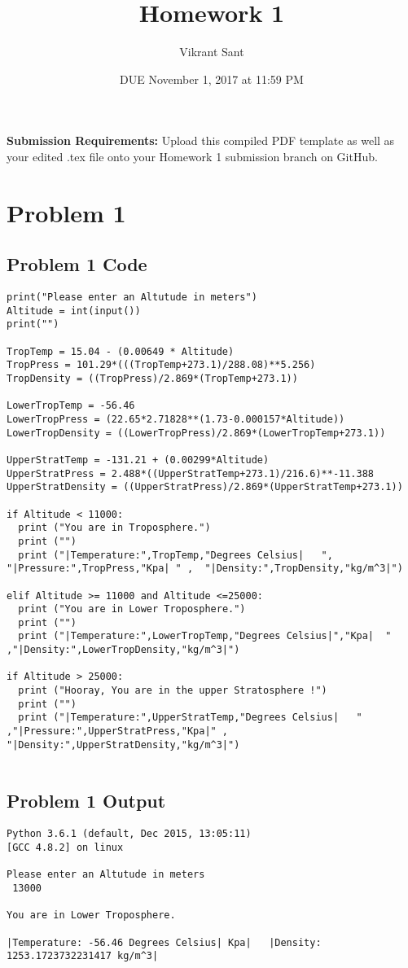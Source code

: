 \documentclass{article}
\title{Homework 1}
\author{Vikrant Sant}
\date{DUE November 1, 2017 at 11:59 PM}
\begin{document}
\maketitle

\bigskip
\bigskip
\bigskip
\bigskip
\bigskip
\bigskip
\textbf{Submission Requirements:} Upload this compiled PDF template as well as your edited .tex file onto your Homework 1 submission branch on GitHub.
\newpage
\section{Problem 1}


\subsection{Problem 1 Code}
\begin{verbatim}
print("Please enter an Altutude in meters")
Altitude = int(input())
print("")

TropTemp = 15.04 - (0.00649 * Altitude)
TropPress = 101.29*(((TropTemp+273.1)/288.08)**5.256)
TropDensity = ((TropPress)/2.869*(TropTemp+273.1))

LowerTropTemp = -56.46
LowerTropPress = (22.65*2.71828**(1.73-0.000157*Altitude))
LowerTropDensity = ((LowerTropPress)/2.869*(LowerTropTemp+273.1))

UpperStratTemp = -131.21 + (0.00299*Altitude)
UpperStratPress = 2.488*((UpperStratTemp+273.1)/216.6)**-11.388
UpperStratDensity = ((UpperStratPress)/2.869*(UpperStratTemp+273.1))

if Altitude < 11000:
  print ("You are in Troposphere.")
  print ("")
  print ("|Temperature:",TropTemp,"Degrees Celsius|   ", "|Pressure:",TropPress,"Kpa| " ,  "|Density:",TropDensity,"kg/m^3|")
  
elif Altitude >= 11000 and Altitude <=25000:
  print ("You are in Lower Troposphere.")
  print ("")
  print ("|Temperature:",LowerTropTemp,"Degrees Celsius|","Kpa|  " ,"|Density:",LowerTropDensity,"kg/m^3|")
    
if Altitude > 25000:
  print ("Hooray, You are in the upper Stratosphere !")
  print ("")
  print ("|Temperature:",UpperStratTemp,"Degrees Celsius|   " ,"|Pressure:",UpperStratPress,"Kpa|" , "|Density:",UpperStratDensity,"kg/m^3|")
  
\end{verbatim}


\subsection{Problem 1 Output}
\begin{verbatim}
Python 3.6.1 (default, Dec 2015, 13:05:11)
[GCC 4.8.2] on linux
   
Please enter an Altutude in meters
 13000

You are in Lower Troposphere.

|Temperature: -56.46 Degrees Celsius| Kpa|   |Density: 1253.1723732231417 kg/m^3|
\end{verbatim} 
\end{document}
